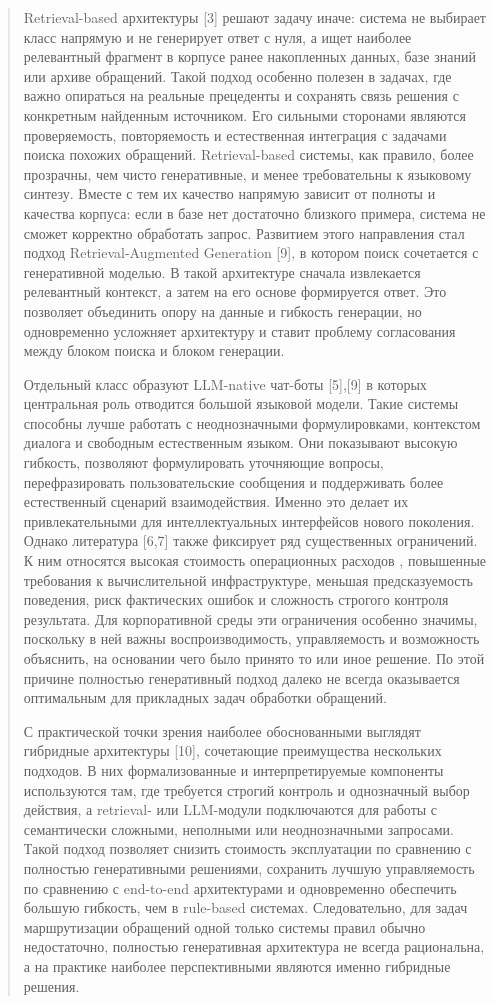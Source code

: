 \begin{quote}
Retrieval-based архитектуры {[}3{]} решают задачу иначе: система не
выбирает класс напрямую и не генерирует ответ с нуля, а ищет наиболее
релевантный фрагмент в корпусе ранее накопленных данных, базе знаний или
архиве обращений. Такой подход особенно полезен в задачах, где важно
опираться на реальные прецеденты и сохранять связь решения с конкретным
найденным источником. Его сильными сторонами являются проверяемость,
повторяемость и естественная интеграция с задачами поиска похожих
обращений. Retrieval-based системы, как правило, более прозрачны, чем
чисто генеративные, и менее требовательны к языковому синтезу. Вместе с
тем их качество напрямую зависит от полноты и качества корпуса: если в
базе нет достаточно близкого примера, система не сможет корректно
обработать запрос. Развитием этого направления стал подход
Retrieval-Augmented Generation {[}9{]}, в котором поиск сочетается с
генеративной моделью. В такой архитектуре сначала извлекается
релевантный контекст, а затем на его основе формируется ответ. Это
позволяет объединить опору на данные и гибкость генерации, но
одновременно усложняет архитектуру и ставит проблему согласования между
блоком поиска и блоком генерации.

Отдельный класс образуют LLM-native чат-боты {[}5{]},{[}9{]} в которых
центральная роль отводится большой языковой модели. Такие системы
способны лучше работать с неоднозначными формулировками, контекстом
диалога и свободным естественным языком. Они показывают высокую
гибкость, позволяют формулировать уточняющие вопросы, перефразировать
пользовательские сообщения и поддерживать более естественный сценарий
взаимодействия. Именно это делает их привлекательными для
интеллектуальных интерфейсов нового поколения. Однако литература
{[}6,7{]} также фиксирует ряд существенных ограничений. К ним относятся
высокая стоимость операционных расходов , повышенные требования к
вычислительной инфраструктуре, меньшая предсказуемость поведения, риск
фактических ошибок и сложность строгого контроля результата. Для
корпоративной среды эти ограничения особенно значимы, поскольку в ней
важны воспроизводимость, управляемость и возможность объяснить, на
основании чего было принято то или иное решение. По этой причине
полностью генеративный подход далеко не всегда оказывается оптимальным
для прикладных задач обработки обращений.

С практической точки зрения наиболее обоснованными выглядят гибридные
архитектуры {[}10{]}, сочетающие преимущества нескольких подходов. В них
формализованные и интерпретируемые компоненты используются там, где
требуется строгий контроль и однозначный выбор действия, а retrieval-
или LLM-модули подключаются для работы с семантически сложными,
неполными или неоднозначными запросами. Такой подход позволяет снизить
стоимость эксплуатации по сравнению с полностью генеративными решениями,
сохранить лучшую управляемость по сравнению с end-to-end архитектурами и
одновременно обеспечить большую гибкость, чем в rule-based системах.
Следовательно, для задач маршрутизации обращений одной только системы
правил обычно недостаточно, полностью генеративная архитектура не всегда
рациональна, а на практике наиболее перспективными являются именно
гибридные решения.
\end{quote}

